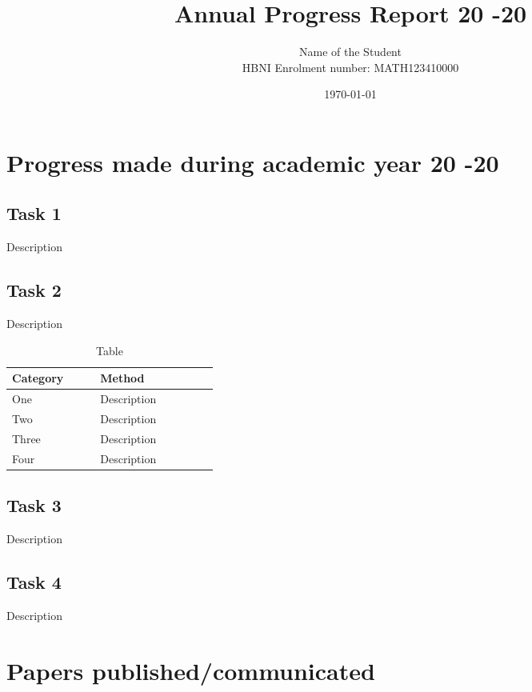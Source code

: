 \documentclass[letterpaper,11pt]{article}
\begin{document}
\title{Annual Progress Report 20  -20  }
\author{Name of the Student\\ HBNI Enrolment number: MATH123410000}
\date{\today}
\maketitle


\section{Progress made during academic year 20  -20  }
\subsection{Task 1}
Description

\subsection{Task 2}
Description

\begin{table}
    \centering
    \caption{Table}
    \begin{tabular}{|p{0.1\linewidth} | p{0.2\linewidth}|}
    \hline
     Category    &  Method  \\
     \hline
     One  &  Description  \\
     \hline
     Two & Description \\
     \hline
     Three & Description \\
     \hline
     Four  & Description \\
     \hline
    \end{tabular}
    \label{tab:methods}
\end{table}

\subsection{Task 3}
Description

\subsection{Task 4}
Description


\section{Papers published/communicated}
\end{document}
